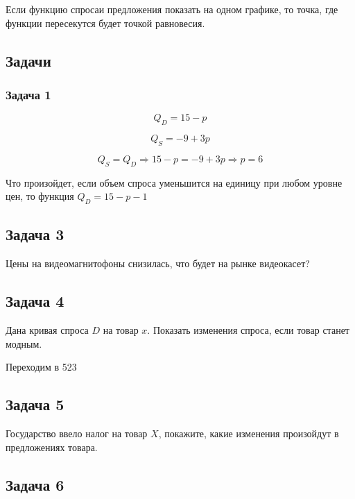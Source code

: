 Если функцию спросаи предложения показать на одном графике, то точка, где функции пересекутся будет точкой равновесия.

\subsection{Задачи}

\subsubsection{Задача 1}

\begin{equation*}
    Q_D = 15 - p
\end{equation*}

\begin{equation*}
    Q_S = -9+3p
\end{equation*}

\begin{equation*}
    Q_S = Q_D \Rightarrow 15 - p = -9 + 3p \Rightarrow p = 6
\end{equation*}

Что произойдет, если объем спроса уменьшится на единицу при любом уровне цен, то функция $Q_D = 15 - p - 1$

\subsection{Задача 3}

Цены на видеомагнитофоны снизилась, что будет на рынке видеокасет?

\subsection{Задача 4}

Дана кривая спроса $D$ на товар $x$. Показать изменения спроса, если товар станет модным.

Переходим в 523

\subsection{Задача 5}

Государство ввело налог на товар $X$, покажите, какие изменения произойдут в предложениях товара.

\subsection{Задача 6}

